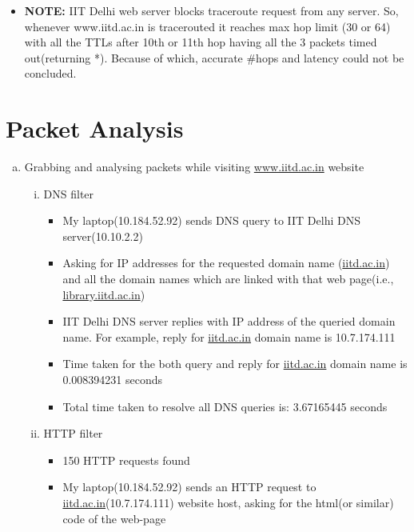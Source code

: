 \documentclass{article}
\begin{document}
    \begin{itemize}
        \item \textbf{NOTE:} IIT Delhi web server blocks traceroute request from any server. So, whenever www.iitd.ac.in is tracerouted it reaches max hop limit (30 or 64) with all the TTLs after 10th or 11th hop having all the 3 packets timed out(returning *). Because of which, accurate \#hops and latency could not be concluded.
    \end{itemize}
        
\section{Packet Analysis}
    \begin{enumerate}[a)]
        \item Grabbing and analysing packets while visiting \href{www.iitd.ac.in}{www.iitd.ac.in} website
            \begin{enumerate}[i)]
                \item DNS filter
                    \begin{itemize}
                        \item My laptop(10.184.52.92) sends DNS query to IIT Delhi DNS server(10.10.2.2)
                        \item Asking for IP addresses for the requested domain name (\href{www.iitd.ac.in}{iitd.ac.in}) and all the domain names which are linked with that web page(i.e., \href{www.library.iitd.ac.in}{library.iitd.ac.in})
                        \item IIT Delhi DNS server replies with IP address of the queried domain name. For example, reply for \href{www.iitd.ac.in}{iitd.ac.in} domain name is 10.7.174.111
                        \item Time taken for the both query and reply for \href{www.iitd.ac.in}{iitd.ac.in} domain name is 0.008394231 seconds
                        \item Total time taken to resolve all DNS queries is: 3.67165445 seconds
                    \end{itemize}{}
                \item HTTP filter
                    \begin{itemize}
                        \item 150 HTTP requests found
                        \item My laptop(10.184.52.92) sends an HTTP request to \href{www.iitd.ac.in}{iitd.ac.in}(10.7.174.111) website host, asking for the html(or similar) code of the web-page

\end{itemize}
\end{enumerate}
\end{enumerate}
\end{document}
